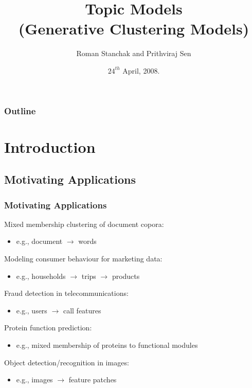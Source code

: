 \documentclass[10pt, svgnames]{beamer}
\title{Topic Models\\ (Generative Clustering Models)}
\author[roman, prithvi]{Roman Stanchak and Prithviraj Sen}
\institute[cmsc828g]{CMSC828G, Instructor: Prof. Lise Getoor}
\date[]{$24^{th}$ April, 2008.}
\begin{document}
\begin{frame}
  \titlepage
\end{frame}

\begin{frame}
\frametitle{Outline}
\tableofcontents
\end{frame}

\section{Introduction}
\subsection{Motivating Applications}

\begin{frame}
\frametitle{Motivating Applications}

Mixed membership clustering of document copora:
\begin{itemize}
\item \footnotesize{e.g., document $\rightarrow$ words}
\end{itemize}

\vspace{10pt}

Modeling consumer behaviour for marketing data:
\begin{itemize}
\item \footnotesize{e.g., households $\rightarrow$ trips $\rightarrow$ products}
\end{itemize}

\vspace{10pt}

Fraud detection in telecommunications:
\begin{itemize}
\item \footnotesize{e.g., users $\rightarrow$ call features}
\end{itemize}

\vspace{10pt}

Protein function prediction:
\begin{itemize}
\item \footnotesize{e.g., mixed membership of proteins to functional modules}
\end{itemize}

\vspace{10pt}

Object detection/recognition in images:
\begin{itemize}
\item \footnotesize{e.g., images $\rightarrow$ feature patches}
\end{itemize}

\end{frame}
\end{document}
